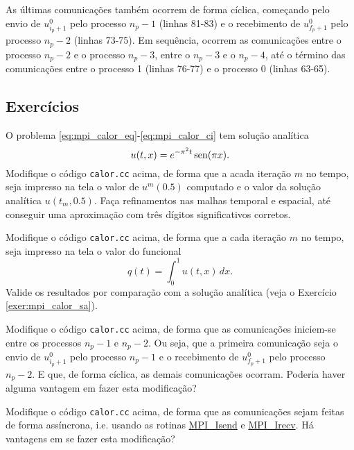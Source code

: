As últimas comunicações também ocorrem de forma cíclica, começando pelo envio de $u^0_{i_p+1}$ pelo processo $n_p-1$ (linhas 81-83) e o recebimento de $u^0_{f_p+1}$ pelo processo $n_p-2$ (linhas 73-75). Em sequência, ocorrem as comunicações entre o processo $n_p-2$ e o processo $n_p-3$, entre o $n_p-3$ e o $n_p-4$, até o término das comunicações entre o processo 1 (linhas 76-77) e o processo 0 (linhas 63-65).

\subsection* {Exercícios}

\begin{exer}\label{exer:mpi_calor_sa}
  O problema \eqref{eq:mpi_calor_eq}-\eqref{eq:mpi_calor_ci} tem solução analítica
  \begin{equation}
    u(t,x) = e^{-\pi^2 t}\operatorname{sen}(\pi x). 
  \end{equation}
  Modifique o código \verb+calor.cc+ acima, de forma que a acada iteração $m$ no tempo, seja impresso na tela o valor de $u^m(0.5)$ computado e o valor da solução analítica $u(t_m, 0.5)$. Faça refinamentos nas malhas temporal e espacial, até conseguir uma aproximação com três dígitos significativos corretos.
\end{exer}

\begin{exer}
  Modifique o código \verb+calor.cc+ acima, de forma que a cada iteração $m$ no tempo, seja impresso na tela o valor do funcional
  \begin{equation}
    q(t) = \int_0^1 u(t,x)\,dx.
  \end{equation}
  Valide os resultados por comparação com a solução analítica (veja o Exercício \eqref{exer:mpi_calor_sa}).
\end{exer}

\begin{exer}
  Modifique o código \verb+calor.cc+ acima, de forma que as comunicações iniciem-se entre os processos $n_p-1$ e $n_p-2$. Ou seja, que a primeira comunicação seja o envio de $u^0_{i_p+1}$ pelo processo $n_p-1$ e o recebimento de $u^0_{f_p+1}$ pelo processo $n_p-2$. E que, de forma cíclica, as demais comunicações ocorram. Poderia haver alguma vantagem em fazer esta modificação?
\end{exer}

\begin{exer}
  Modifique o código \verb+calor.cc+ acima, de forma que as comunicações sejam feitas de forma assíncrona, i.e. usando as rotinas \href{https://www.open-mpi.org/doc/v1.8/man3/MPI\_Isend.3.php}{MPI\_Isend} e \href{https://www.open-mpi.org/doc/v1.8/man3/MPI\_Irecv.3.php}{MPI\_Irecv}. Há vantagens em se fazer esta modificação?
\end{exer}


